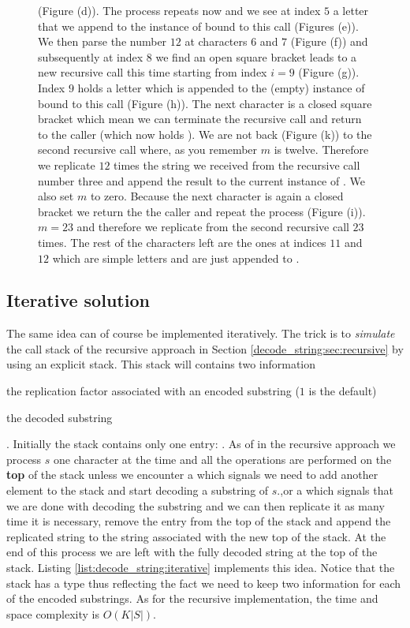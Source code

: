 \begin{figure}
{	(Figure (d)). The process repeats now and we see at index $5$ a letter that we append to the
	instance of  bound to this call (Figures (e)). We then parse the number $12$ at
	characters $6$ and $7$ (Figure (f)) and subsequently at index $8$ we find an open square bracket
	leads to a new recursive call this time starting from index $i=9$ (Figure (g)). Index $9$ holds
	a letter which is appended to the (empty) instance of  bound to this call (Figure
	(h)). The next character is a closed square bracket which mean we can terminate the recursive
	call and return to the caller  (which now holds ). We are not back
	(Figure (k)) to the second recursive call where, as you remember $m$ is twelve. Therefore we
	replicate $12$ times the string we received from the recursive call number three and append the
	result to the current instance of . We also set $m$ to zero. Because the next
	character is again a closed bracket we return the the caller and repeat the process (Figure
	(i)).$m=23$ and therefore we replicate  from the second recursive call $23$ times.
	The rest of the characters left are the ones at indices $11$ and $12$ which are simple letters
	and are just appended to .}	
   \label{fig:decode_string:recursion}
 \end{figure}

 \subsection{Iterative solution}
 \label{decode_string:sec:iterative}
The same idea can of course be implemented iteratively. The trick is to \textit{simulate} the call
stack of the recursive approach in Section \ref{decode_string:sec:recursive} by using an explicit
stack. This stack will contains two information 
\begin{enumerate*}
	\item the replication factor associated with an encoded substring ($1$ is the default)
	\item the decoded substring \end{enumerate*}. Initially the stack contains only one entry: 
	. 
	As of in the recursive approach we process $s$ one character  at the time and all the
operations are performed on the \textbf{top} of the stack unless we encounter a \inline{'['} which
signals we need to add another element to the stack and start decoding a substring of $s$.,or a
\inline{']'} which signals that we are done with decoding the substring and we can then replicate it
as many time it is necessary, remove the entry from the top of the stack and append the replicated
string to the string associated with the new top of the stack. At the end of this process we are
left with the fully decoded string at the top of the stack. Listing
\ref{list:decode_string:iterative} implements this idea. Notice that the stack has a type
 thus reflecting the fact we need to keep two
information for each of the encoded substrings.
As for the recursive implementation, the time and space complexity is $O(K|S|)$.


